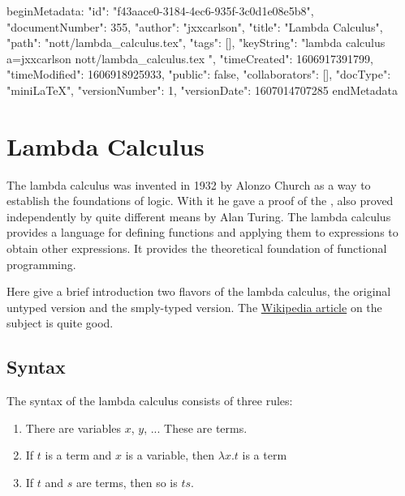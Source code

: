 beginMetadata:
{
    "id": "f43aace0-3184-4ec6-935f-3c0d1e08e5b8",
    "documentNumber": 355,
    "author": "jxxcarlson",
    "title": "Lambda Calculus",
    "path": "nott/lambda_calculus.tex",
    "tags": [],
    "keyString": "lambda calculus a=jxxcarlson nott/lambda_calculus.tex ",
    "timeCreated": 1606917391799,
    "timeModified": 1606918925933,
    "public": false,
    "collaborators": [],
    "docType": "miniLaTeX",
    "versionNumber": 1,
    "versionDate": 1607014707285
}
endMetadata

\setcounter{section}{4}

\section{Lambda Calculus}


\innertableofcontents

The lambda calculus was invented in 1932 by Alonzo Church as a way to establish the foundations of logic.  With it he gave a proof of the , also proved independently by quite different means by Alan Turing.  The lambda calculus provides a language for defining functions and applying them to expressions to obtain other expressions. It  provides the theoretical foundation of functional programming.

Here give a brief introduction two flavors of the lambda calculus, the original untyped version and the smply-typed version.  The \href{https://en.wikipedia.org/wiki/Lambda_calculus}{Wikipedia article} on the subject is quite good.  

\subsection{Syntax}

The syntax of the lambda calculus consists of three rules:

\begin{enumerate}

\item There are variables $x$, $y$, ...  These are terms.

\item If $t$ is a term and $x$ is a variable, then $\lambda x.t$ is a term

\item If $t$ and $s$ are terms, then so is $ts$.

\end{enumerate}

